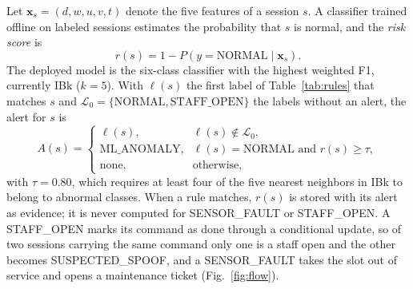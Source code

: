 \documentclass[manuscript,screen]{acmart}
\begin{document}
Let $\mathbf{x}_s = (d, w, u, v, t)$ denote the five features of a session $s$. A classifier trained offline on labeled
sessions estimates the probability that $s$ is normal, and the \emph{risk score} is
\begin{equation}
r(s) = 1 - P\left(y = \text{NORMAL} \mid \mathbf{x}_s\right).
\label{eq:risk}
\end{equation}
The deployed model is the six-class classifier with the highest weighted F1, currently IBk ($k=5$). With $\ell(s)$ the
first label of Table~\ref{tab:rules} that matches $s$ and $\mathcal{L}_0 = \{\text{NORMAL}, \text{STAFF\_OPEN}\}$ the
labels without an alert, the alert for $s$ is
\begin{equation}
A(s) =
\begin{cases}
\ell(s), & \ell(s) \notin \mathcal{L}_0,\\
\text{ML\_ANOMALY}, & \ell(s) = \text{NORMAL} \text{ and } r(s) \geq \tau,\\
\text{none}, & \text{otherwise},
\end{cases}
\label{eq:alert}
\end{equation}
with $\tau = 0.80$, which requires at least four of the five nearest neighbors in IBk to belong to abnormal classes.
When a rule matches, $r(s)$ is stored with its alert as evidence; it is never computed for SENSOR\_FAULT or
STAFF\_OPEN. A STAFF\_OPEN marks its command as done through a conditional update, so of two sessions carrying the same
command only one is a staff open and the other becomes SUSPECTED\_SPOOF, and a SENSOR\_FAULT takes the slot out of
service and opens a maintenance ticket (Fig.~\ref{fig:flow}).
\end{document}

